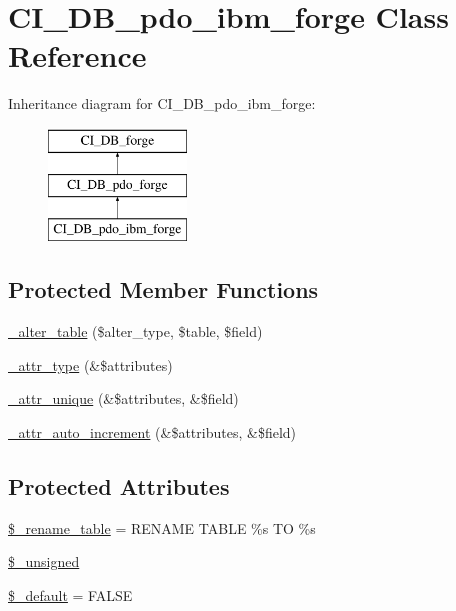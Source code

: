 \hypertarget{class_c_i___d_b__pdo__ibm__forge}{}\section{C\+I\+\_\+\+D\+B\+\_\+pdo\+\_\+ibm\+\_\+forge Class Reference}
\label{class_c_i___d_b__pdo__ibm__forge}
Inheritance diagram for C\+I\+\_\+\+D\+B\+\_\+pdo\+\_\+ibm\+\_\+forge\+:\begin{figure}[H]
\begin{center}
\leavevmode
\includegraphics[height=3.000000cm]{class_c_i___d_b__pdo__ibm__forge}
\end{center}
\end{figure}
\subsection*{Protected Member Functions}
\begin{DoxyCompactItemize}
\item 
\hyperlink{class_c_i___d_b__pdo__ibm__forge_a41c6cae02f2fda8b429ad0afb9509426}{\+\_\+alter\+\_\+table} (\$alter\+\_\+type, \$table, \$field)
\item 
\hyperlink{class_c_i___d_b__pdo__ibm__forge_a8553be952084c6f7cdfff370a1d14f6b}{\+\_\+attr\+\_\+type} (\&\$attributes)
\item 
\hyperlink{class_c_i___d_b__pdo__ibm__forge_a7568a93ea53a7392a63fffe83bb7a090}{\+\_\+attr\+\_\+unique} (\&\$attributes, \&\$field)
\item 
\hyperlink{class_c_i___d_b__pdo__ibm__forge_a2a013a5932439c3c44f0dad3436525f7}{\+\_\+attr\+\_\+auto\+\_\+increment} (\&\$attributes, \&\$field)
\end{DoxyCompactItemize}
\subsection*{Protected Attributes}
\begin{DoxyCompactItemize}
\item 
\hyperlink{class_c_i___d_b__pdo__ibm__forge_a1a649e7cf9de16bcf932977b18bc91de}{\$\+\_\+rename\+\_\+table} = \textquotesingle{}R\+E\+N\+A\+M\+E T\+A\+B\+L\+E \%s T\+O \%s\textquotesingle{}
\item 
\hyperlink{class_c_i___d_b__pdo__ibm__forge_aae977ae6d61fa183f0b25422b6ddc31c}{\$\+\_\+unsigned}
\item 
\hyperlink{class_c_i___d_b__pdo__ibm__forge_aa119e1b4e3d00f47a7b83b7066087915}{\$\+\_\+default} = F\+A\+L\+S\+E
\end{DoxyCompactItemize}
